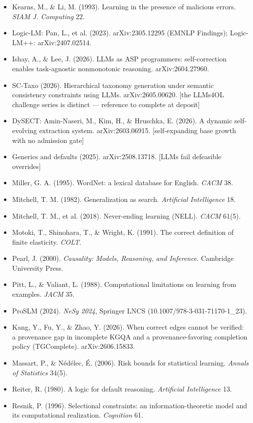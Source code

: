 \documentclass[11pt]{article}
\begin{document}
\begin{itemize}
\item Kearns, M., \& Li, M. (1993). Learning in the presence of malicious errors. \emph{SIAM J. Computing} 22.
\item Logic-LM: Pan, L., et al. (2023). arXiv:2305.12295 (EMNLP Findings); Logic-LM++: arXiv:2407.02514.
\item Ishay, A., \& Lee, J. (2026). LLMs as ASP programmers: self-correction enables task-agnostic nonmonotonic reasoning. arXiv:2604.27960.
\item SC-Taxo (2026). Hierarchical taxonomy generation under semantic consistency constraints using LLMs. arXiv:2605.00620. [the LLMs4OL challenge series is distinct — reference to complete at deposit]
\item DySECT: Amin-Naseri, M., Kim, H., \& Hruschka, E. (2026). A dynamic self-evolving extraction system. arXiv:2603.06915. [self-expanding base growth with no admission gate]
\item Generics and defaults (2025). arXiv:2508.13718. [LLMs fail defeasible overrides]
\item Miller, G. A. (1995). WordNet: a lexical database for English. \emph{CACM} 38.
\item Mitchell, T. M. (1982). Generalization as search. \emph{Artificial Intelligence} 18.
\item Mitchell, T. M., et al. (2018). Never-ending learning (NELL). \emph{CACM} 61(5).
\item Motoki, T., Shinohara, T., \& Wright, K. (1991). The correct definition of finite elasticity. \emph{COLT}.
\item Pearl, J. (2000). \emph{Causality: Models, Reasoning, and Inference}. Cambridge University Press.
\item Pitt, L., \& Valiant, L. (1988). Computational limitations on learning from examples. \emph{JACM} 35.
\item ProSLM (2024). \emph{NeSy 2024}, Springer LNCS (10.1007/978-3-031-71170-1\_23).
\item Kang, Y., Fu, Y., \& Zhao, Y. (2026). When correct edges cannot be verified: a provenance gap in incomplete KGQA and a provenance-favoring completion policy (TGComplete). arXiv:2606.15833.
\item Massart, P., \& Nédélec, É. (2006). Risk bounds for statistical learning. \emph{Annals of Statistics} 34(5).
\item Reiter, R. (1980). A logic for default reasoning. \emph{Artificial Intelligence} 13.
\item Resnik, P. (1996). Selectional constraints: an information-theoretic model and its computational realization. \emph{Cognition} 61.

\end{itemize}
\end{document}
